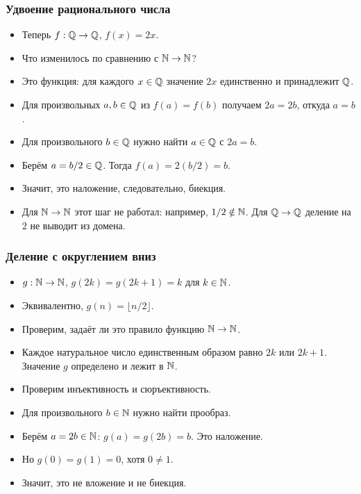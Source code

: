 \documentclass[10pt]{beamer}
\begin{document}
\begin{frame}
    \frametitle{Удвоение рационального числа}
    \begin{itemize}
        \item Теперь $f:\mathbb{Q}\to\mathbb{Q}$, $f(x)=2x$.
        \item Что изменилось по сравнению с $\mathbb{N}\to\mathbb{N}$?
        \item<2-> Это функция: для каждого $x\in\mathbb{Q}$ значение $2x$ единственно и принадлежит $\mathbb{Q}$.
        \item<3-> Для произвольных $a,b\in\mathbb{Q}$ из $f(a)=f(b)$ получаем $2a=2b$, откуда $a=b$.
        \item<4-> Для произвольного $b\in\mathbb{Q}$ нужно найти $a\in\mathbb{Q}$ с $2a=b$.
        \item<5-> Берём $a=b/2\in\mathbb{Q}$. Тогда $f(a)=2(b/2)=b$.
        \item<6-> Значит, это наложение, следовательно, биекция.
        \item<7-> Для $\mathbb{N}\to\mathbb{N}$ этот шаг не работал: например, $1/2\notin\mathbb{N}$. Для $\mathbb{Q}\to\mathbb{Q}$ деление на $2$ не выводит из домена.
    \end{itemize}
\end{frame}

\begin{frame}
    \frametitle{Деление с округлением вниз}
    \begin{itemize}
        \item $g:\mathbb{N}\to\mathbb{N}$, $g(2k)=g(2k+1)=k$ для $k\in\mathbb{N}$.
        \item Эквивалентно, $g(n)=\lfloor n/2\rfloor$.
        \item Проверим, задаёт ли это правило функцию $\mathbb{N}\to\mathbb{N}$.
        \item<2-> Каждое натуральное число единственным образом равно $2k$ или $2k+1$. Значение $g$ определено и лежит в $\mathbb{N}$.
        \item<3-> Проверим инъективность и сюръективность.
        \item<4-> Для произвольного $b\in\mathbb{N}$ нужно найти прообраз.
        \item<5-> Берём $a=2b\in\mathbb{N}$: $g(a)=g(2b)=b$. Это наложение.
        \item<6-> Но $g(0)=g(1)=0$, хотя $0\neq1$.
        \item<7-> Значит, это не вложение и не биекция.
    \end{itemize}
\end{frame}
\end{document}
